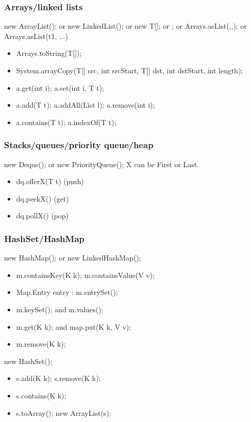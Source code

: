 \documentclass[10pt]{article}
\begin{document}
\subsubsection{Arrays/linked lists}
new ArrayList(); or new LinkedList(); or new T[]; or {}; or Arrays.asList(,,); or Arrays.asList(t1, ...)
\begin{itemize}
    \item Arrays.toString(T[]);
    \item System.arrayCopy(T[] src, int srcStart, T[] dst, int dstStart, int length);
    \item a.get(int i); a.set(int i, T t);
    \item a.add(T t); a.addAll(List l); a.remove(int i);
    \item a.contains(T t); a.indexOf(T t);
\end{itemize}
\subsubsection{Stacks/queues/priority queue/heap}
new Deque(); or new PriorityQueue();
X can be First or Last.
\begin{itemize}
    \item dq.offerX(T t) (push)
    \item dq.peekX() (get)
    \item dq.pollX() (pop)
\end{itemize}
\subsubsection{HashSet/HashMap}
new HashMap(); or new LinkedHashMap();
\begin{itemize}
    \item m.containsKey(K k); m.containsValue(V v);
    \item Map.Entry entry : m.entrySet();
    \item m.keySet(); and m.values();
    \item m.get(K k); and map.put(K k, V v);
    \item m.remove(K k);
\end{itemize}
new HashSet();
\begin{itemize}
    \item s.add(K k); s.remove(K k);
    \item s.contains(K k);
    \item s.toArray(); new ArrayList(s);
\end{itemize}
\end{document}
